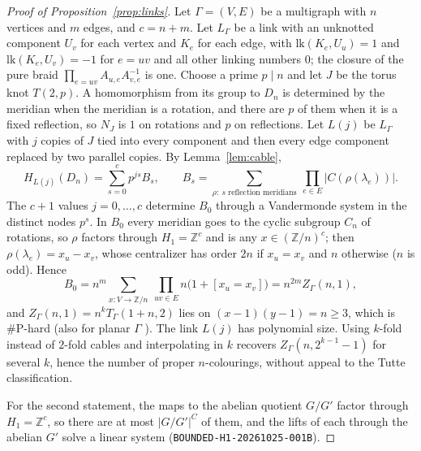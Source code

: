 \documentclass[11pt]{article}
\theoremstyle{definition}
\theoremstyle{remark}
\newcommand{\Z}{\mathbb{Z}}
\newcommand{\sharpP}{\#\mathrm{P}}
\begin{document}
\begin{proof}[Proof of Proposition~\ref{prop:links}]
Let $\Gamma=(V,E)$ be a multigraph with $n$ vertices and $m$ edges, and
$c=n+m$. Let $L_\Gamma$ be a link with an unknotted component $U_v$ for each
vertex and $K_e$ for each edge, with $\mathrm{lk}(K_e,U_u)=1$ and
$\mathrm{lk}(K_e,U_v)=-1$ for $e=uv$ and all other linking numbers $0$; the
closure of the pure braid $\prod_{e=uv}A_{u,e}A_{v,e}^{-1}$ is one. Choose a
prime $p\mid n$ and let $J$ be the torus knot $T(2,p)$. A homomorphism from its
group to $D_n$ is determined by the meridian when the meridian is a rotation,
and there are $p$ of them when it is a fixed reflection, so $N_J$ is $1$ on
rotations and $p$ on reflections. Let $L(j)$ be $L_\Gamma$ with $j$ copies of
$J$ tied into every component and then every edge component replaced by two
parallel copies. By Lemma~\ref{lem:cable},
\[
H_{L(j)}(D_n)=\sum_{s=0}^{c}p^{js}B_s,\qquad
B_s=\sum_{\rho:\ s\text{ reflection meridians}}\ \prod_{e\in E}|C(\rho(\lambda_e))|.
\]
The $c+1$ values $j=0,\dots,c$ determine $B_0$ through a Vandermonde system in
the distinct nodes $p^s$. In $B_0$ every meridian goes to the cyclic subgroup
$C_n$ of rotations, so $\rho$ factors through $H_1=\Z^c$ and is any
$x\in(\Z/n)^c$; then $\rho(\lambda_e)=x_u-x_v$, whose centralizer has order $2n$
if $x_u=x_v$ and $n$ otherwise ($n$ is odd). Hence
\[
B_0=n^m\sum_{x\colon V\to\Z/n}\ \prod_{uv\in E}n\bigl(1+[x_u=x_v]\bigr)=n^{2m}Z_\Gamma(n,1),
\]
and $Z_\Gamma(n,1)=n^kT_\Gamma(1+n,2)$ lies on $(x-1)(y-1)=n\ge3$, which is
$\sharpP$-hard \cite{JVW90} (also for planar $\Gamma$ \cite{Ver05}). The link $L(j)$
has polynomial size. Using $k$-fold instead of $2$-fold cables and
interpolating in $k$ recovers $Z_\Gamma(n,2^{k-1}-1)$ for several $k$, hence the
number of proper $n$-colourings, without appeal to the Tutte classification.

For the second statement, the maps to the abelian quotient $G/G'$ factor
through $H_1=\Z^c$, so there are at most $|G/G'|^C$ of them, and the lifts of each
through the abelian $G'$ solve a linear system (\texttt{BOUNDED-H1-20261025-001B}).
\end{proof}
\end{document}
